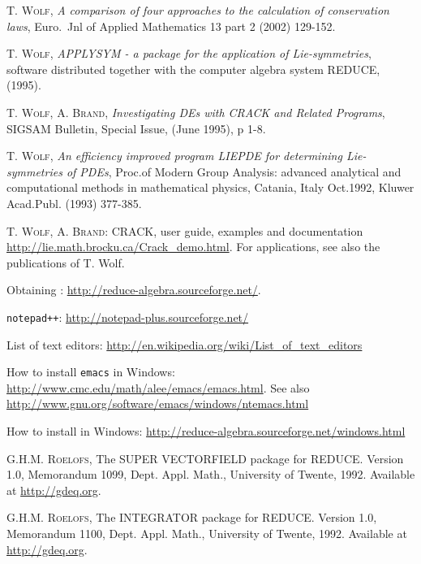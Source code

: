 \begin{thebibliography}{999}
 \textsc{T. Wolf}, \emph{A comparison of four approaches to the
    calculation of conservation laws}, Euro.\ Jnl of Applied Mathematics 13
  part 2 (2002) 129-152.

 \textsc{T. Wolf}, \emph{APPLYSYM - a package for the
    application of Lie-symmetries}, software distributed together with the
  computer algebra system REDUCE, (1995).

 \textsc{T. Wolf, A. Brand}, \emph{Investigating DEs with CRACK
    and Related Programs}, SIGSAM Bulletin, Special Issue, (June 1995), p 1-8.

 \textsc{T. Wolf}, \emph{An efficiency improved program LIEPDE
    for determining Lie-symmetries of PDEs}, Proc.of Modern Group Analysis:
  advanced analytical and computational methods in mathematical physics,
  Catania, Italy Oct.1992, Kluwer Acad.Publ. (1993) 377-385.

 \textsc{T. Wolf, A. Brand}: CRACK, user guide, examples and
    documentation \url{http://lie.math.brocku.ca/Crack_demo.html}. For
    applications, see also the publications of T. Wolf.


 Obtaining \REDUCE: \url{http://reduce-algebra.sourceforge.net/}.


 \texttt{notepad++}:
    \url{http://notepad-plus.sourceforge.net/}

 List of text editors:
    \url{http://en.wikipedia.org/wiki/List_of_text_editors}

 How to install \texttt{emacs} in Windows:
    \url{http://www.cmc.edu/math/alee/emacs/emacs.html}. See also
    \url{http://www.gnu.org/software/emacs/windows/ntemacs.html}

 How to install \REDUCE in Windows:
    \url{http://reduce-algebra.sourceforge.net/windows.html}

 \textsc{G.H.M. Roelofs}, The SUPER VECTORFIELD package for
    REDUCE. Version 1.0, Memorandum 1099, Dept. Appl. Math., University of
    Twente, 1992. Available at \url{http://gdeq.org}.

 \textsc{G.H.M. Roelofs}, The INTEGRATOR package for
    REDUCE. Version 1.0, Memorandum 1100, Dept. Appl. Math., University of
    Twente, 1992. Available at \url{http://gdeq.org}.


\end{thebibliography}
